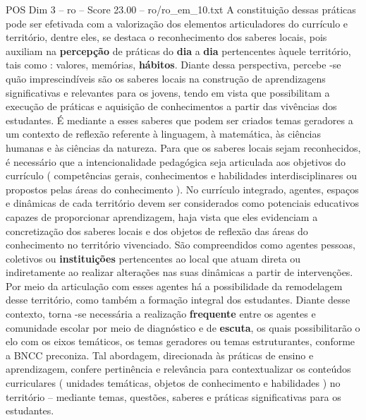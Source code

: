 \begin{textsample}{POS Dim 3 – ro – Score 23.00 – ro/ro\_em\_10.txt}
A constituição dessas práticas pode ser efetivada com a valorização dos elementos articuladores do currículo e território, dentre eles, se destaca o reconhecimento dos saberes locais, pois auxiliam na \textbf{percepção} de práticas do \textbf{dia} a \textbf{dia} pertencentes àquele território, tais como : valores, memórias, \textbf{hábitos}.
Diante dessa perspectiva, percebe -se quão imprescindíveis são os saberes locais na construção de aprendizagens significativas e relevantes para os jovens, tendo em vista que possibilitam a execução de práticas e aquisição de conhecimentos a partir das vivências dos estudantes.
É mediante a esses saberes que podem ser criados temas geradores a um contexto de reflexão referente à linguagem, à matemática, às ciências humanas e às ciências da natureza.
Para que os saberes locais sejam reconhecidos, é necessário que a intencionalidade pedagógica seja articulada aos objetivos do currículo ( competências gerais, conhecimentos e habilidades interdisciplinares ou propostos pelas áreas do conhecimento ).
No currículo integrado, agentes, espaços e dinâmicas de cada território devem ser considerados como potenciais educativos capazes de proporcionar aprendizagem, haja vista que eles evidenciam a concretização dos saberes locais e dos objetos de reflexão das áreas do conhecimento no território vivenciado.
São compreendidos como agentes pessoas, coletivos ou \textbf{instituições} pertencentes ao local que atuam direta ou indiretamente ao realizar alterações nas suas dinâmicas a partir de intervenções.
Por meio da articulação com esses agentes há a possibilidade da remodelagem desse território, como também a formação integral dos estudantes.
Diante desse contexto, torna -se necessária a realização \textbf{frequente} entre os agentes e comunidade escolar por meio de diagnóstico e de \textbf{escuta}, os quais possibilitarão o elo com os eixos temáticos, os temas geradores ou temas estruturantes, conforme a BNCC preconiza.
Tal abordagem, direcionada às práticas de ensino e aprendizagem, confere pertinência e relevância para contextualizar os conteúdos curriculares ( unidades temáticas, objetos de conhecimento e habilidades ) no território – mediante temas, questões, saberes e práticas significativas para os estudantes.

\end{textsample}
